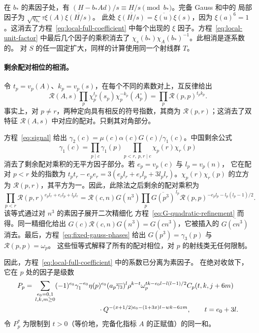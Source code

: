 \documentclass[11pt,a4paper]{article}
\numberwithin{equation}{section}
\numberwithin{figure}{section}
\theoremstyle{definition}
\theoremstyle{remark}
\begin{document}
在 $b_*$ 的素因子处，有
$(H-b_*Ad)/s\equiv H/s\pmod {b_*}$。完备 Gauss 和中的
局部因子为
$\sqrt{q_{b_*}}\tau\xi(A)\overline{\xi(H/s)}$。
此处 $\overline{\xi(H/s)}=\overline{\xi(u)}\xi(s)$，因为
$\xi(a)^6=1$。这消去了方程~\eqref{eq:local-full-coefficient}
中每个出现的 $\xi$ 因子。方程~\eqref{eq:local-unit-factor}
中最后几个因子的乘积消去了
$\chi_s(b_*)\chi_A(b_*)^{-1}$。此相消是逐系数的。
对 $S$ 的任一固定扩大，同样的计算使用同一个射线群 $T$。

\paragraph{剩余配对相位的相消。}
令 $t_p=v_p(A)$、$k_p=v_p(s)$，在每个不同的素数对上，互反律给出
\[
 \mathcal R(A,s)\prod_p
       \chi_p^{t_p}(s_p)\chi_p^{-k_p}(A_p^\circ)
       =\prod_p\mathcal R(p,p)^{t_pk_p}.
\]
事实上，对 $p\ne r$，两种定向具有相反的符号指数，其商为
$\mathcal R(p,r)$；这消去了双特征 $\mathcal R(A,s)$ 中对应的配对。只剩其对角部分。

方程~\eqref{eq:signal} 给出
$\gamma_2(c)=\mu(c)\alpha(c)G(c)/\gamma_1(c)$。中国剩余公式
\[
 \gamma_1(c)=\prod_{p\mid c}\gamma_1(p)
             \prod_{p<r,\ p,r\mid c}\chi_p(r)\chi_r(p)
\]
消去了剩余配对乘积的无平方因子部分。若 $e_p=v_p(c)$ 与 $l_p=v_p(n)$，
它在配对 $p<r$ 处的指数为
$t_pt_r-e_pe_r=3(e_pl_r+e_rl_p+3l_pl_r)$。$\chi_p(r)\chi_r(p)$
的立方为 $\mathcal R(p,r)$，其平方为一。因此，此除法之后剩余的配对乘积为
\[
 \prod_{p<r}\mathcal R(p,r)^{e_pl_r+e_rl_p+l_pl_r}
 =\mathcal R(c,n)G(n^3)
   \prod_p\overline{G(p^3)}^{\,l_p}
            \mathcal R(p,p)^{-e_pl_p-l_p(l_p-1)/2}.
\]
该等式通过对 $n^3$ 的素因子展开二次精细化
方程~\eqref{eq:G-quadratic-refinement} 而得。同一精细化给出
$G(c)\mathcal R(c,n)G(n^3)=G(cn^3)$，它被插入的
$\overline{G(cn^3)}$ 消去。最后，方程~\eqref{eq:fixed-gauss-phases}
给出 $G(p^3)=\gamma_3(p)$ 与 $\mathcal R(p,p)=\omega_p$。
这些恒等式解释了所有的配对相位，对 $p$ 的射线类无任何限制。

因此，方程~\eqref{eq:local-full-coefficient} 中的系数已分离为素因子。
在绝对收敛下，它在 $p$ 处的因子是级数
\begin{equation}\label{eq:local-P}
\begin{aligned}
 P_p={}&\sum_{\substack{e_0=0,1\\l,k,m\ge0}}
 (-1)^{e_0}\gamma_1^{-e_0}\eta(p)^{e_0}
 (a_p\overline{\gamma_3})^l\rho^{k-t}
 \omega_p^{tk-e_0l-l(l-1)/2}C_p(t,k,j+6m)\\
 &\hspace{33mm}\cdot
 Q^{-(x+1/2)e_0-(1+3x)l-wk-6zm},\qquad t=e_0+3l.
\end{aligned}
\end{equation}
令 $P_p^*$ 为限制到 $t>0$（等价地，完备化指标 $A$ 的正赋值）的同一和。
\end{document}

